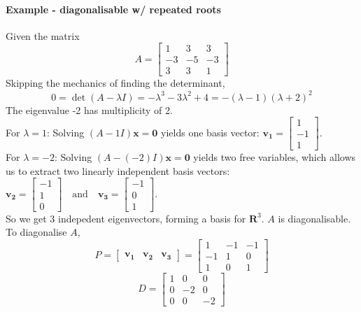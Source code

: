 \documentclass[../linear-algebra.tex]{subfiles}
\begin{document}
\paragraph{Example - diagonalisable w/ repeated roots} Given the matrix
$$A = \begin{bmatrix} 1 & 3 & 3 \\ -3 & -5 & -3 \\ 3 & 3 & 1 \end{bmatrix}$$
Skipping the mechanics of finding the determinant,
$$0 = \det(A - \lambda I) = -\lambda^3 - 3\lambda^2 + 4 = -(\lambda - 1)(\lambda + 2)^2$$
The eigenvalue -2 has multiplicity of 2.\\
For $\lambda = 1$: Solving $(A - 1I)\mathbf{x} = \mathbf{0}$ yields one basis vector: $\mathbf{v_1} = \begin{bmatrix} 1 \\ -1 \\ 1 \end{bmatrix}$.\\
For $\lambda = -2$: Solving $(A - (-2)I)\mathbf{x} = \mathbf{0}$ yields two free variables, which allows us to extract two linearly independent basis vectors: $\mathbf{v_2} = \begin{bmatrix} -1 \\ 1 \\ 0 \end{bmatrix} \quad \text{and} \quad \mathbf{v_3} = \begin{bmatrix} -1 \\ 0 \\ 1 \end{bmatrix}$.\\
So we get 3 indepedent eigenvectors, forming a basis for $\mathbf{R}^3$. $A$ is diagonalisable.\\
To diagonalise $A$,
$$P = \begin{bmatrix} \mathbf{v_1} & \mathbf{v_2} & \mathbf{v_3} \end{bmatrix} = \begin{bmatrix} 1 & -1 & -1 \\ -1 & 1 & 0 \\ 1 & 0 & 1 \end{bmatrix}$$
$$D = \begin{bmatrix} 1 & 0 & 0 \\ 0 & -2 & 0 \\ 0 & 0 & -2 \end{bmatrix}$$
\end{document}
